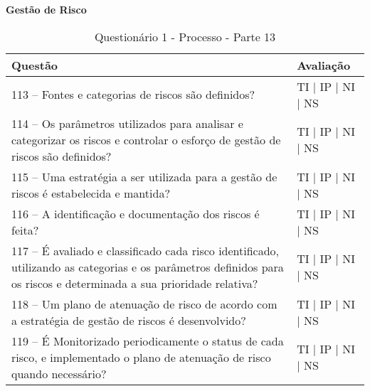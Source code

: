 \documentclass[openany,10pt,a4paper]{article}
\begin{document}
\begin{appendix}
\begin{table}[h]
\textbf{Gestão de Risco}
	\centering
	\caption{Questionário 1 - Processo - Parte 13}
	\begin{tabular}{p{3.5in}p{2in}}		
		\toprule
		\textbf{Questão}  & \textbf{Avaliação}\\ 
		\midrule
		113 – Fontes e categorias de riscos são definidos?
 & TI | IP | NI | NS \\
        \midrule
		114 – Os parâmetros utilizados para analisar e categorizar os riscos e controlar o esforço de 
gestão de riscos são definidos?
 & TI | IP | NI | NS \\
		\midrule
		115 – Uma estratégia a ser utilizada para a gestão de riscos é estabelecida e mantida?
 & TI | IP | NI | NS \\
		\midrule
        116 – A identificação e documentação dos riscos é feita?
 & TI | IP | NI | NS \\
		\midrule
	117 – É avaliado e classificado cada risco identificado, utilizando as categorias e os parâmetros 
definidos para os riscos e determinada a sua prioridade relativa?
  & TI | IP | NI | NS \\
		\midrule
		118 – Um plano de atenuação de risco de acordo com a estratégia de gestão de riscos é 
desenvolvido?
 & TI | IP | NI | NS \\
 \midrule
		119 – É Monitorizado periodicamente o status de cada risco, e implementado o plano de 
atenuação de risco quando necessário?
 & TI | IP | NI | NS \\
		\bottomrule
	\end{tabular} 
	\label{tab:tabela1}
\end{table}


\end{appendix}
\end{document}
